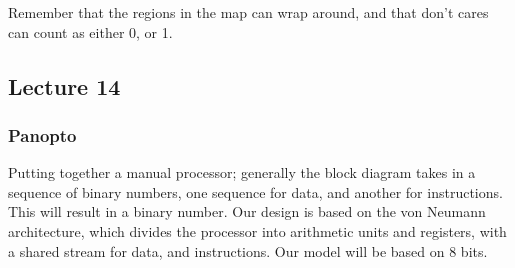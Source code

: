 \documentclass[a4paper, 12pt]{article}
\begin{document}
                Remember that the regions in the map can wrap around, and that don't cares can count as either 0, or 1.
        \subsection*{Lecture 14}
            \subsubsection*{Panopto}
                Putting together a manual processor; generally the block diagram takes in a sequence of binary numbers, one sequence for data, and another for instructions. This will result in a binary number. Our design is based on the von Neumann architecture, which divides the processor into arithmetic units and registers, with a shared stream for data, and instructions. Our model will be based on 8 bits.
                \medskip
\end{document}
